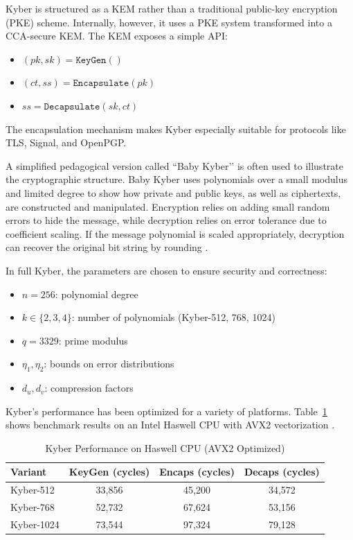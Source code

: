 Kyber is structured as a KEM rather than a traditional public-key encryption (PKE) scheme. Internally, however, it uses a PKE system transformed into a CCA-secure KEM. The KEM exposes a simple API:
\begin{itemize}
    \item $(\mathit{pk}, \mathit{sk}) = \texttt{KeyGen}()$
    \item $(\mathit{ct}, \mathit{ss}) = \texttt{Encapsulate}(\mathit{pk})$
    \item $\mathit{ss} = \texttt{Decapsulate}(\mathit{sk}, \mathit{ct})$
\end{itemize}

The encapsulation mechanism makes Kyber especially suitable for protocols like TLS, Signal, and OpenPGP. %

A simplified pedagogical version called ``Baby Kyber’’ is often used to illustrate the cryptographic structure. Baby Kyber uses polynomials over a small modulus and limited degree to show how private and public keys, as well as ciphertexts, are constructed and manipulated. Encryption relies on adding small random errors to hide the message, while decryption relies on error tolerance due to coefficient scaling. If the message polynomial is scaled appropriately, decryption can recover the original bit string by rounding \cite{kyber2021}. %

In full Kyber, the parameters are chosen to ensure security and correctness:
\begin{itemize}
    \item $n = 256$: polynomial degree
    \item $k \in \{2, 3, 4\}$: number of polynomials (Kyber-512, 768, 1024)
    \item $q = 3329$: prime modulus
    \item $\eta_1, \eta_2$: bounds on error distributions
    \item $d_u, d_v$: compression factors
\end{itemize}

Kyber’s performance has been optimized for a variety of platforms. Table~\ref{tab:kyber_perf} shows benchmark results on an Intel Haswell CPU with AVX2 vectorization \cite{kyber2024}. %

\begin{table}[h]
\centering
\caption{Kyber Performance on Haswell CPU (AVX2 Optimized)}
\label{tab:kyber_perf}
\begin{tabular}{|l|c|c|c|}
\hline
\textbf{Variant} & \textbf{KeyGen (cycles)} & \textbf{Encaps (cycles)} & \textbf{Decaps (cycles)} \\
\hline
Kyber-512 & 33,856 & 45,200 & 34,572 \\
Kyber-768 & 52,732 & 67,624 & 53,156 \\
Kyber-1024 & 73,544 & 97,324 & 79,128 \\
\hline
\end{tabular}
\end{table}

